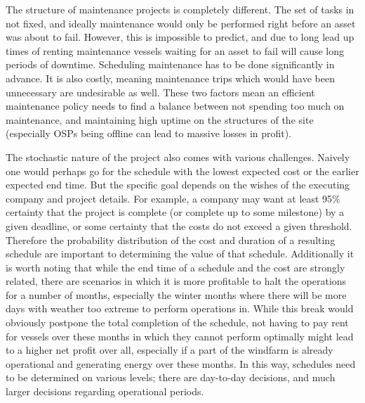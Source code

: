 \documentclass[a4paper,12pt]{article}
\begin{document}
The structure of maintenance projects is completely different. The set of tasks in not fixed, and ideally maintenance would only be performed right before an asset was about to fail. However, this is impossible to predict, and due to long lead up times of renting maintenance vessels waiting for an asset to fail will cause long periods of downtime. Scheduling maintenance has to be done significantly in advance. It is also costly, meaning maintenance trips which would have been unnecessary are undesirable as well. These two factors mean an efficient maintenance policy needs to find a balance between not spending too much on maintenance, and maintaining high uptime on the structures of the site (especially OSPs being offline can lead to massive losses in profit). 

The stochastic nature of the project also comes with various challenges. Naively one would perhaps go for the schedule with the lowest expected cost or the earlier expected end time. But the specific goal depends on the wishes of the executing company and project details. For example, a company may want at least 95\% certainty that the project is complete (or complete up to some milestone) by a given deadline, or some certainty that the costs do not exceed a given threshold. Therefore the probability distribution of the cost and duration of a resulting schedule are important to determining the value of that schedule. Additionally it is worth noting that while the end time of a schedule and the cost are strongly related, there are scenarios in which it is more profitable to halt the operations for a number of months, especially the winter months where there will be more days with weather too extreme to perform operations in. While this break would obviously postpone the total completion of the schedule, not having to pay rent for vessels over these months in which they cannot perform optimally might lead to a higher net profit over all, especially if a part of the windfarm is already operational and generating energy over these months. In this way, schedules need to be determined on various levels; there are day-to-day decisions, and much larger decisions regarding operational periods. 

\end{document}
